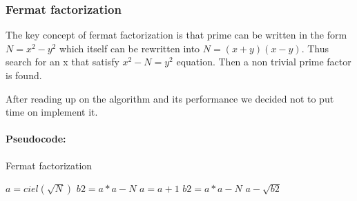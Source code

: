 \subsubsection{Fermat factorization}

The key concept of fermat factorization is that prime can be written in the form $N = x^2 - y^2$ which itself can be rewritten into $N = (x+y)(x-y)$. Thus search for an x that satisfy $x^2 - N = y^2$ equation. Then a non trivial prime factor is found.   

After reading up on the algorithm and its performance we decided not to put time on implement it.

\paragraph{Pseudocode:}

\textcolor{white}{ }

\begin{algorithm}[H]
\caption{Fermat factorization}
\begin{algorithmic}
	\State $a = ciel(\sqrt{N})$
	\State $b2 = a*a - N$
		\State $a = a + 1$
		\State $b2 = a*a - N$
	\EndWhile	
	\State \Return $a - \sqrt{b2}$
\EndFunction
\end{algorithmic}
\end{algorithm}